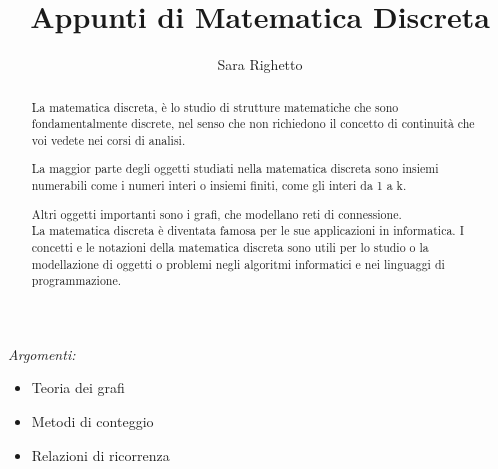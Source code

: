 \documentclass[12pt,a4paper]{article}
\begin{document}
    \author{Sara Righetto}
    \title{Appunti di Matematica Discreta}

    \maketitle

    \newpage
    \tableofcontents %

    \newpage

    \begin{abstract} 
        La matematica discreta, è lo studio di strutture matematiche che sono fondamentalmente discrete, nel senso che non
    richiedono il concetto di continuità che voi vedete nei corsi di analisi. \par
    La maggior parte degli oggetti studiati nella matematica discreta sono insiemi numerabili come i numeri interi o
    insiemi finiti, come gli interi da 1 a k. \par
    Altri oggetti importanti sono i grafi, che modellano reti di connessione. \\

        La matematica discreta è diventata famosa per le sue applicazioni in informatica. I concetti e le notazioni della matematica discreta sono utili per lo studio o la modellazione di oggetti o problemi negli algoritmi informatici e nei linguaggi di programmazione.
    \end{abstract}

\begin{center}
    \textit{Argomenti:}
    \begin{itemize}
        \item Teoria dei grafi 
        \item Metodi di conteggio
        \item Relazioni di ricorrenza
    \end{itemize}
\end{center}

    \newpage















\end{document}
